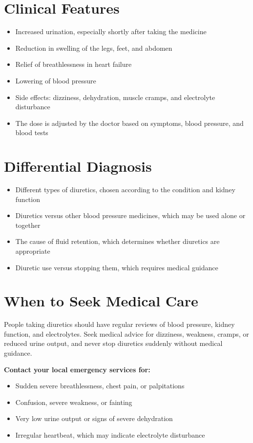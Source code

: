 \section*{Clinical Features}
\begin{itemize}
    \item Increased urination, especially shortly after taking the medicine
    \item Reduction in swelling of the legs, feet, and abdomen
    \item Relief of breathlessness in heart failure
    \item Lowering of blood pressure
    \item Side effects: dizziness, dehydration, muscle cramps, and electrolyte disturbance
    \item The dose is adjusted by the doctor based on symptoms, blood pressure, and blood tests
\end{itemize}

\section*{Differential Diagnosis}
\begin{itemize}
    \item Different types of diuretics, chosen according to the condition and kidney function
    \item Diuretics versus other blood pressure medicines, which may be used alone or together
    \item The cause of fluid retention, which determines whether diuretics are appropriate
    \item Diuretic use versus stopping them, which requires medical guidance
\end{itemize}

\section*{When to Seek Medical Care}
People taking diuretics should have regular reviews of blood pressure, kidney function, and electrolytes. Seek medical advice for dizziness, weakness, cramps, or reduced urine output, and never stop diuretics suddenly without medical guidance.

\textbf{Contact your local emergency services for:}
\begin{itemize}
    \item Sudden severe breathlessness, chest pain, or palpitations
    \item Confusion, severe weakness, or fainting
    \item Very low urine output or signs of severe dehydration
    \item Irregular heartbeat, which may indicate electrolyte disturbance
\end{itemize}

